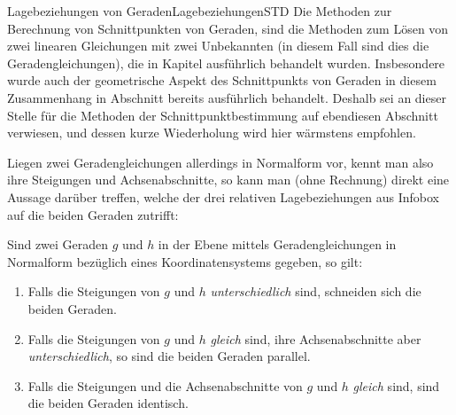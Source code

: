\begin{MXContent}{Lagebeziehungen von Geraden}{Lagebeziehungen}{STD}
Die Methoden zur Berechnung von Schnittpunkten von Geraden, sind die Methoden zum Lösen von zwei linearen Gleichungen mit zwei Unbekannten (in diesem Fall sind dies die Geradengleichungen), die in Kapitel  ausführlich behandelt wurden. Insbesondere wurde auch der geometrische Aspekt des Schnittpunkts von Geraden in diesem Zusammenhang in Abschnitt  bereits ausführlich behandelt. Deshalb sei an dieser Stelle für die Methoden der Schnittpunktbestimmung auf ebendiesen Abschnitt  verwiesen, und dessen kurze Wiederholung wird hier wärmstens empfohlen.  

Liegen zwei Geradengleichungen allerdings in Normalform vor, kennt man also ihre Steigungen und Achsenabschnitte, so kann man (ohne Rechnung) direkt eine Aussage darüber treffen, welche der drei relativen Lagebeziehungen aus Infobox  auf die beiden Geraden zutrifft:

\begin{MInfo}
Sind zwei Geraden $g$ und $h$ in der Ebene mittels Geradengleichungen in Normalform bezüglich eines Koordinatensystems gegeben, so gilt:
\begin{enumerate}
 \item Falls die Steigungen von $g$ und $h$ \textit{unterschiedlich} sind, schneiden sich die beiden Geraden.
 \item Falls die Steigungen von $g$ und $h$ \textit{gleich} sind, ihre Achsenabschnitte aber \textit{unterschiedlich}, so sind die beiden Geraden parallel.
 \item Falls die Steigungen und die Achsenabschnitte von $g$ und $h$ \textit{gleich} sind, sind die beiden Geraden identisch.
\end{enumerate}

\end{MInfo}


\end{MXContent}
